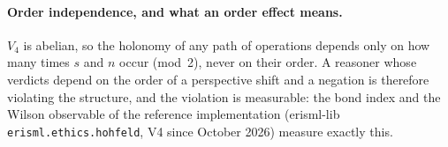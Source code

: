 \paragraph{Order independence, and what an order effect means.} $V_4$ is abelian, so the holonomy of
any path of operations depends only on how many times $s$ and $n$ occur (mod~2), never on their
order. A reasoner whose verdicts depend on the order of a perspective shift and a negation is
therefore violating the structure, and the violation is measurable: the bond index and the Wilson
observable of the reference implementation (erisml-lib \texttt{erisml.ethics.hohfeld}, V4 since
October 2026) measure exactly this.
